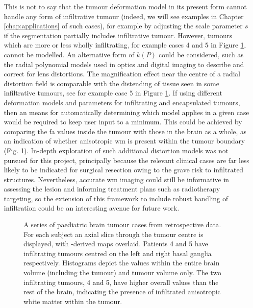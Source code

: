 \documentclass[12pt,phd,a4paper,twoside]{ucl_thesis}
\begin{document}
This is not to say that the tumour deformation model in its present form cannot handle any form of infiltrative tumour (indeed, we will see examples in Chapter \ref{chap:applications} of such cases), for example by adjusting the scale parameter $s$ if the segmentation partially includes infiltrative tumour.
However, tumours which are more or less wholly infiltrating, for example cases 4 and 5 in Figure \ref{fig:fa_hist}, cannot be modelled.
An alternative form of $k(P)$ could be considered, such as the radial polynomial models used in optics and digital imaging to describe and correct for lens distortions\autocite{Zhang2000a}.
The magnification effect near the centre of a radial distortion field is comparable with the distending of tissue seen in some infiltrative tumours, see for example case 5 in Figure \ref{fig:fa_hist}.
If using different deformation models and parameters for infiltrating and encapsulated tumours, then an means for automatically determining which model applies in a given case would be required to keep user input to a minimum.
This could be achieved by comparing the \gls{fa} values inside the tumour with those in the brain as a whole, as an indication of whether anisotropic \gls{wm} is present within the tumour boundary (Fig. \ref{fig:fa_hist}).
In-depth exploration of such additional distortion models was not pursued for this project, principally because the relevant clinical cases are far less likely to be indicated for surgical resection owing to the grave risk to infiltrated structures.
Nevertheless, accurate \gls{wm} imaging could still be informative in assessing the lesion and informing treatment plans such as radiotherapy targeting\autocite{Jena2005,Berberat2014}, so the extension of this framework to include robust handling of infiltration could be an interesting avenue for future work.

\begin{figure}[htb!]
  \caption[Intra-tumoural FA indicates infiltration]{A series of paediatric brain tumour cases from retrospective  data. For each subject an axial slice through the tumour centre is displayed, with -derived   maps overlaid. Patients 4 and 5 have infiltrating tumours centred on the left and right basal ganglia respectively. Histograms depict the  values within the entire brain volume (including the tumour) and tumour volume only. The two infiltrating tumours, 4 and 5, have higher overall  values than the rest of the brain, indicating the presence of infiltrated anisotropic white matter within the tumour.}
  \label{fig:fa_hist}
\end{figure}
\end{document}
